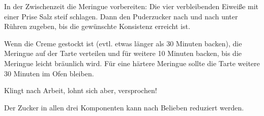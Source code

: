 \begin{recipe}
{In der Zwischenzeit die Meringue vorbereiten: Die vier verbleibenden Eiweiße mit einer Prise Salz steif schlagen. Dann den Puderzucker nach und nach unter Rühren zugeben, bis die gewünschte Konsistenz erreicht ist.

Wenn die Creme gestockt ist (evtl. etwas länger als 30 Minuten backen), die Meringue auf der Tarte verteilen und für weitere 10 Minuten backen, bis die Meringue leicht bräunlich wird. Für eine härtere Meringue sollte die Tarte weitere 30 Minuten im Ofen bleiben.

}

\hint
    {%
    Klingt nach Arbeit, lohnt sich aber, versprochen!
    
    Der Zucker in allen drei Komponenten kann nach Belieben reduziert werden.
    }

\end{recipe}
